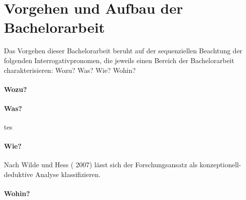 \section{Vorgehen und Aufbau der Bachelorarbeit }\label{sec:Vorgehen}

Das Vorgehen dieser Bachelorarbeit beruht auf der sequenziellen Beachtung der folgenden Interrogativpronomen, die jeweils einen Bereich der Bachelorarbeit charakterisieren: Wozu? Was? Wie? Wohin?

\paragraph{Wozu?}

\paragraph{Was?}
tes


\paragraph{Wie?}
Nach Wilde und Hess ( 2007) lässt sich der Forschungsansatz als konzeptionell-deduktive Analyse klassifizieren.


\paragraph{Wohin?}
